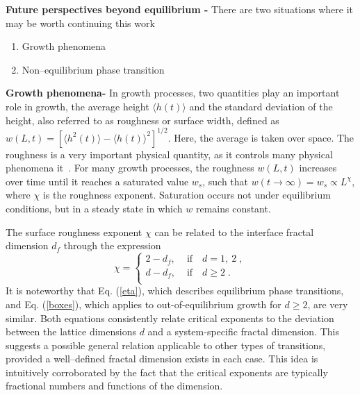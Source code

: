 \documentclass[pre,aps,twocolumn,showpacs,floatfix,nofootinbib,superscriptaddress,linenumbers]{revtex4-1}
\begin{document}
{\bf Future perspectives beyond equilibrium -} There are two situations where it may be worth continuing this work
\begin{enumerate}
    \item Growth phenomena
    \item Non--equilibrium phase transition
\end{enumerate}
{\bf Growth phenomena-} In growth processes, two quantities play an important role in growth, the average height $ \langle h(t) \rangle $ and the standard deviation of the height, also referred to as roughness or surface width, defined as $w(L,t)= \left[ \langle h^2(t) \rangle - \langle h(t) \rangle^2\right]^{1/2}$. Here, the average is taken over space. The roughness is a very important physical quantity, as it controls many physical phenomena it~\cite{Edwards82,Kardar86,Barabasi95,Gomes19,Reis05,Rodrigues15,Alves16,Carrasco18,Krug92,Krug97,Derrida98,Meakin86,Daryaei20,Hansen00,Rodrigues24}. For many growth processes, the roughness $w(L,t)$ increases {over} time until it reaches a saturated value $w_s$, such that $w(t \rightarrow \infty)=w_s \propto L^\chi$, where $\chi$ is the roughness exponent.   Saturation occurs not under equilibrium conditions, but in a steady state in which $w$ remains constant.

The surface roughness exponent $\chi$ can be related to the interface fractal dimension $d_f$ through the expression~\cite{feder2013fractals,Barabasi95}
\begin{equation}
\label{boxes}
\chi=
\begin{cases}
2-d_f , &\text{ if~~ } d=1,\ 2\;, \\
d-d_f, &\text{ if~~ } d \geq 2\;.\\
\end{cases}
\end{equation}
It is noteworthy that  Eq. (\ref{eta}), which describes equilibrium phase transitions, and Eq. (\ref{boxes}), which applies to out-of-equilibrium growth for $d \geq 2$, are very similar. Both equations consistently relate critical exponents to the deviation between the lattice dimensions $d$ and a system-specific fractal dimension. This suggests a possible general relation applicable to other types of transitions, provided a well--defined fractal dimension exists in each case. This idea is intuitively corroborated by the fact that the critical exponents are typically fractional numbers and functions of the dimension.

\end{document}

